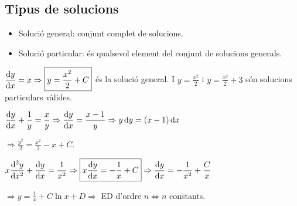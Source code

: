 \subsection{Tipus de solucions}
\begin{itemize}
	\item Solució general: conjunt complet de solucions.
	\item Solució particular: és qualsevol element del conjunt de solucions generals.
\end{itemize}

\begin{example}
    $\displaystyle \frac{\mathrm{d} y}{\mathrm{d} x} = x \Rightarrow \boxed{y = \frac{x^{2}}{2} + C}$ és la solució general. I $\displaystyle y = \frac{x^{2}}{2}$ i $\displaystyle y = \frac{x^{2}}{2} + 3$ són solucions particulars vàlides.
\end{example}
\begin{example}
    $\displaystyle \frac{\mathrm{d} y}{\mathrm{d} x} + \frac{1}{y} = \frac{x}{y} \Rightarrow \frac{\mathrm{d} y}{\mathrm{d} x} = \frac{x - 1}{y} \Rightarrow y \mathop{}\!\mathrm{d} y = (x - 1) \mathop{}\!\mathrm{d} x$

    $\displaystyle \Rightarrow \boxed{\frac{y^{2}}{2} = \frac{x^{2}}{2} - x + C}$.
\end{example}
\begin{example}
    $\displaystyle x \frac{\mathrm{d}^{2} y}{\mathrm{d} x^{2}} + \frac{\mathrm{d} y}{\mathrm{d} x} = \frac{1}{x^{2}} \Rightarrow \boxed{x \frac{\mathrm{d} y}{\mathrm{d} x} = -\frac{1}{x} + C} \Rightarrow \frac{\mathrm{d} y}{\mathrm{d} x} = -\frac{1}{x^{2}} + \frac{C}{x}$

    $\Rightarrow \boxed{y = \frac{1}{x} + C \ln x + D} \Rightarrow$ ED d'ordre $n \Leftrightarrow n$ constants.
\end{example}

